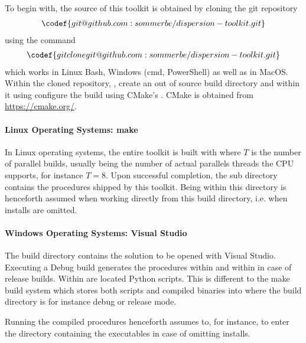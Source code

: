 To begin with, the source of this toolkit is obtained by cloning the git repository
\begin{align*}
  \codef{git@github.com:sommerbe/dispersion-toolkit.git}
\end{align*}
using the command
\begin{align*}
  \codef{git clone git@github.com:sommerbe/dispersion-toolkit.git}
\end{align*}
which works in Linux Bash, Windows (cmd, PowerShell) as well as in MacOS. Within the cloned repository,
,
create an out of source build directory
and within it using
configure the build using CMake's
.
CMake is obtained from \href{https://cmake.org/}{https://cmake.org/}.


\paragraph{Linux Operating Systems: make}

In Linux operating systems, the entire toolkit is built with
where $T$ is the number of parallel builds, usually being the number of actual parallels threads the CPU supports, for instance $T=8$. Upon successful completion, the sub directory
contains the procedures shipped by this toolkit. Being within this directory is henceforth assumed when working directly from this build directory, i.e. when installs are omitted.


\paragraph{Windows Operating Systems: Visual Studio}

The build directory contains the solution
to be opened with Visual Studio. Executing a Debug build generates the procedures within
and within
in case of release builds. Within
are located Python scripts. This is different to the make build system which stores both scripts and compiled binaries into  where the build directory  is for instance debug or release mode.

Running the compiled procedures henceforth assumes to, for instance,
to enter the directory containing the executables in case of omitting installs.

